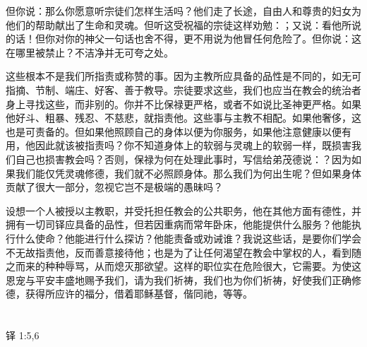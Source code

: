 但你说：那么你愿意听宗徒们怎样生活吗？他们走了长途，自由人和尊贵的妇女为他们的帮助献出了生命和灵魂。但听这受祝福的宗徒这样劝勉：；又说：看他所说的话！但你对你的神父一句话也舍不得，更不用说为他冒任何危险了。但你说：这在哪里被禁止？不洁净并无可夸之处。\par

这些根本不是我们所指责或称赞的事。因为主教所应具备的品性是不同的，如无可指摘、节制、端庄、好客、善于教导。宗徒要求这些，我们也应当在教会的统治者身上寻找这些，而非别的。你并不比保禄更严格，或者不如说比圣神更严格。如果他好斗、粗暴、残忍、不慈悲，就指责他。这些事与主教不相配。如果他奢侈，这也是可责备的。但如果他照顾自己的身体以便为你服务，如果他注意健康以便有用，他因此就该被指责吗？你不知道身体上的软弱与灵魂上的软弱一样，既损害我们自己也损害教会吗？否则，保禄为何在处理此事时，写信给弟茂德说：？因为如果我们能仅凭灵魂修德，我们就不必照顾身体。那么我们为何出生呢？但如果身体贡献了很大一部分，忽视它岂不是极端的愚昧吗？\par

设想一个人被授以主教职，并受托担任教会的公共职务，他在其他方面有德性，并拥有一切司铎应具备的品性，但若因重病而常年卧床，他能提供什么服务？他能执行什么使命？他能进行什么探访？他能责备或劝诫谁？我说这些话，是要你们学会不无故指责他，反而善意接待他；也是为了让任何渴望在教会中掌权的人，看到随之而来的种种辱骂，从而熄灭那欲望。这样的职位实在危险很大，它需要。为使这恩宠与平安丰盛地赐予我们，请为我们祈祷，我们也为你们祈祷，好使我们正确修德，获得所应许的福分，借着耶稣基督，偕同祂，等等。\par



\section{}

铎 1:5,6\par

